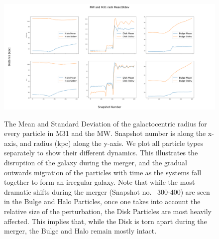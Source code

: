 \documentclass[linenumbers, ]{aastex631}
\begin{document}
\begin{figure}
    \centering
    \includegraphics[width = \linewidth]{figures/meanstdev.png}
    \label{fig:meanstdev}
    \caption{The Mean and Standard Deviation of the galactocentric radius for every particle in M31 and the MW. Snapshot number is along the x-axis, and radius (kpc) along the y-axis. We plot all particle types separately to show their different dynamics. This illustrates the disruption of the galaxy during the merger, and the gradual outwards migration of the particles with time as the systems fall together to form an irregular galaxy. Note that while the most dramatic shifts during the merger (Snapshot no. ~300-400) are seen in the Bulge and Halo Particles, once one takes into account the relative size of the perturbation, the Disk Particles are most heavily affected. This implies that, while the Disk is torn apart during the merger, the Bulge and Halo remain mostly intact.}
\end{figure}
\end{document}
